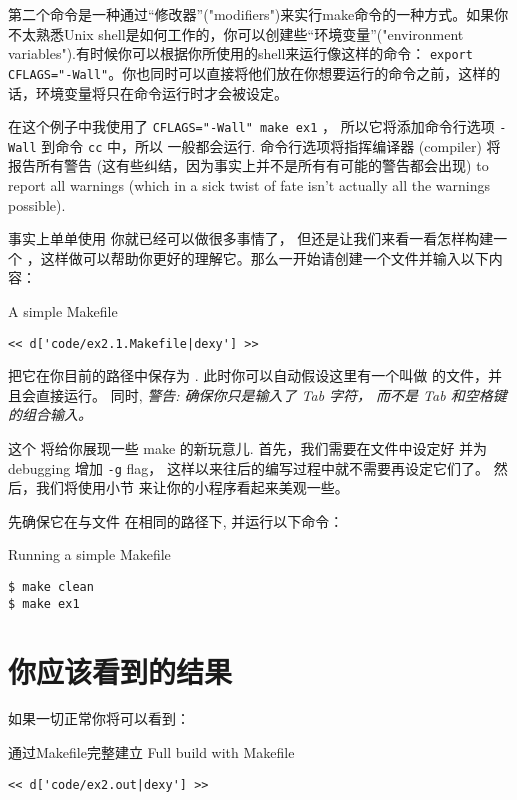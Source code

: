 第二个命令是一种通过“修改器”("modifiers")来实行make命令的一种方式。如果你不太熟悉Unix shell是如何工作的，你可以创建些“环境变量”("environment variables").有时候你可以根据你所使用的shell来运行像这样的命令： \verb|export CFLAGS="-Wall"|。你也同时可以直接将他们放在你想要运行的命令之前，这样的话，环境变量将只在命令运行时才会被设定。

在这个例子中我使用了 \verb|CFLAGS="-Wall" make ex1| ， 所以它将添加命令行选项 \verb|-Wall| 到命令 \verb|cc| 中，所以
 一般都会运行.  命令行选项将指挥编译器 (compiler)
 将报告所有警告 (这有些纠结，因为事实上并不是所有有可能的警告都会出现) to report all warnings (which in a sick twist of fate isn't
actually all the warnings possible).

事实上单单使用  你就已经可以做很多事情了， 但还是让我们来看一看怎样构建一个  ，这样做可以帮助你更好的理解它。那么一开始请创建一个文件并输入以下内容：

\begin{code}{A simple Makefile}
\begin{lstlisting}
<< d['code/ex2.1.Makefile|dexy'] >>
\end{lstlisting}
\end{code}

把它在你目前的路径中保存为 . 此时你可以自动假设这里有一个叫做  的文件，并且会直接运行。 同时, \emph{警告: 确保你只是输入了 Tab 字符， 而不是 Tab 和空格键的组合输入。}

这个  将给你展现一些 make 的新玩意儿. 首先，我们需要在文件中设定好  并为 debugging 增加 \verb|-g| flag， 这样以来往后的编写过程中就不需要再设定它们了。 然后，我们将使用小节  来让你的小程序看起来美观一些。

先确保它在与文件  在相同的路径下, 并运行以下命令：

\begin{Terminal}{Running a simple Makefile}
\begin{lstlisting}
$ make clean
$ make ex1
\end{lstlisting}
\end{Terminal}


\section{你应该看到的结果}

如果一切正常你将可以看到：

\begin{Terminal}{通过Makefile完整建立 Full build with Makefile}
\begin{lstlisting}
<< d['code/ex2.out|dexy'] >>
\end{lstlisting}
\end{Terminal}

